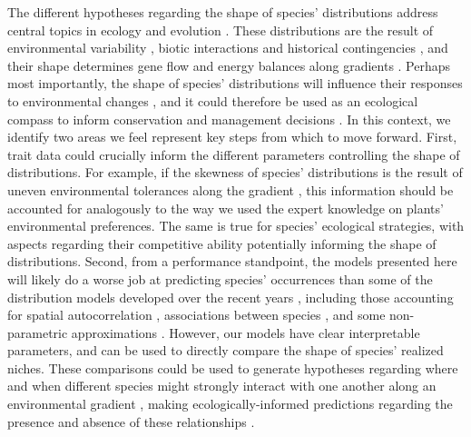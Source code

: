\documentclass[11pt, a4paper]{article}
\begin{document}
The different hypotheses regarding the shape of species' distributions address central topics in ecology and evolution \citep{sagarinAbundantCentreDistribution2002}. These distributions are the result of environmental variability \citep{helmuthClimateChangeLatitudinal2002, butterfieldEnvironmentalFilteringIncreases2015}, biotic interactions \citep{hastingsUnexpectedSpatialPatterns1997} and historical contingencies \citep{frickEmergingDiseaseCauses2010}, and their shape determines gene flow \citep{haldaneRelationDensityRegulation1956, lesicaWhenArePeripheral1995, pirononGeographicVariationGenetic2017} and energy balances along gradients \citep{hallDistributionAbundanceOrganisms1992}. Perhaps most importantly, the shape of species' distributions will influence their responses to environmental changes \citep{channellDynamicBiogeographyConservation2000}, and it could therefore be used as an ecological compass to inform conservation and management decisions \citep{channellTrajectoriesExtinctionSpatial2000}. In this context, we identify two areas we feel represent key steps from which to move forward. First, trait data could crucially inform the different parameters controlling the shape of distributions. For example, if the skewness of species' distributions is the result of uneven environmental tolerances along the gradient \citep{sundayGlobalAnalysisThermal2011}, this information should be accounted for analogously to the way we used the expert knowledge on plants' environmental preferences. The same is true for species' ecological strategies, with aspects regarding their competitive ability potentially informing the shape of distributions. Second, from a performance standpoint, the models presented here will likely do a worse job at predicting species' occurrences than some of the distribution models developed over the recent years \citep{norbergComprehensiveEvaluationPredictive2019}, including those accounting for spatial autocorrelation \citep{ovaskainenUncoveringHiddenSpatial2016}, associations between species \citep{tikhonovJointSpeciesDistribution2020}, and some non-parametric approximations \citep{harrisGeneratingRealisticAssemblages2015}. However, our models have clear interpretable parameters, and can be used to directly compare the shape of species' realized niches. These comparisons could be used to generate hypotheses regarding where and when different species might strongly interact with one another along an environmental gradient \citep{louthanWhereWhenSpecies2015}, making ecologically-informed predictions regarding the presence and absence of these relationships \citep{SIASH}.
\end{document}
